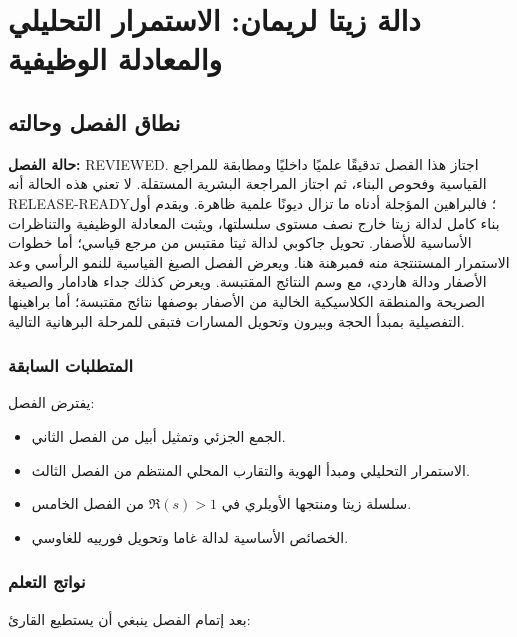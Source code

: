 \chapter{دالة زيتا لريمان: الاستمرار التحليلي والمعادلة الوظيفية}

\section{نطاق الفصل وحالته}

\noindent\textbf{حالة الفصل:} \textenglish{REVIEWED}. اجتاز هذا الفصل
تدقيقًا علميًا داخليًا ومطابقة للمراجع القياسية وفحوص البناء، ثم اجتاز
المراجعة البشرية المستقلة. لا تعني هذه الحالة أنه
\textenglish{RELEASE-READY}؛ فالبراهين المؤجلة أدناه ما تزال ديونًا
علمية ظاهرة. ويقدم أول
بناء كامل لدالة زيتا خارج نصف مستوى سلسلتها، ويثبت المعادلة الوظيفية
والتناظرات الأساسية للأصفار. تحويل جاكوبي لدالة ثيتا مقتبس من مرجع قياسي؛
أما خطوات الاستمرار المستنتجة منه فمبرهنة هنا. ويعرض الفصل الصيغ
القياسية للنمو الرأسي وعد الأصفار ودالة هاردي، مع وسم النتائج المقتبسة.
ويعرض كذلك جداء هادامار والصيغة الصريحة والمنطقة الكلاسيكية الخالية
من الأصفار بوصفها نتائج مقتبسة؛ أما براهينها التفصيلية بمبدأ الحجة
وبيرون وتحويل المسارات فتبقى للمرحلة البرهانية التالية.

\subsection{المتطلبات السابقة}

يفترض الفصل:

\begin{itemize}
  \item الجمع الجزئي وتمثيل أبيل من الفصل الثاني.
  \item الاستمرار التحليلي ومبدأ الهوية والتقارب المحلي المنتظم من الفصل
  الثالث.
  \item سلسلة زيتا ومنتجها الأويلري في \(\Re(s)>1\) من الفصل الخامس.
  \item الخصائص الأساسية لدالة غاما وتحويل فورييه للغاوسي.
\end{itemize}

\subsection{نواتج التعلم}

بعد إتمام الفصل ينبغي أن يستطيع القارئ:

